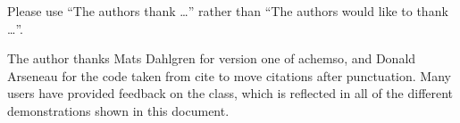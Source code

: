 \documentclass[journal=jacsat,manuscript=article]{achemso}
\begin{document}

\begin{acknowledgement}

Please use ``The authors thank \ldots'' rather than ``The
authors would like to thank \ldots''.

The author thanks Mats Dahlgren for version one of \textsf{achemso},
and Donald Arseneau for the code taken from \textsf{cite} to move
citations after punctuation. Many users have provided feedback on the
class, which is reflected in all of the different demonstrations
shown in this document.

\end{acknowledgement}
\end{document}
